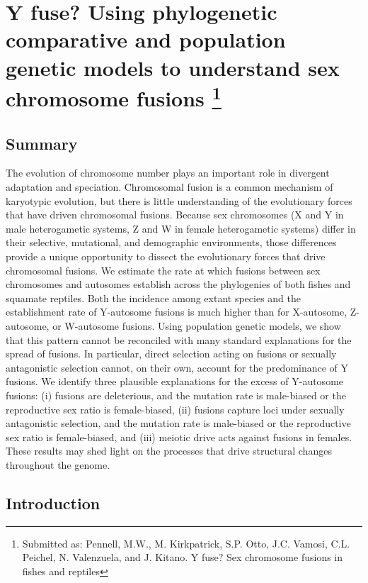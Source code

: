 \chapter[Y fuse? Using phylogenetic comparative and population genetic models to understand sex chromosome fusions]{Y fuse? Using phylogenetic comparative and population genetic models to understand sex chromosome fusions \footnote{Submitted as: Pennell, M.W., M. Kirkpatrick, S.P. Otto, J.C. Vamosi, C.L. Peichel, N. Valenzuela, and J. Kitano. Y fuse? Sex chromosome fusions in fishes and reptiles}}
\label{chap:sexchrom}

\section{Summary}

The evolution of chromosome number plays an important role in divergent adaptation and speciation. Chromosomal fusion is a common mechanism of karyotypic evolution, but there is little understanding of the evolutionary forces that have driven chromosomal fusions. Because sex chromosomes (X and Y in male heterogametic systems, Z and W in female heterogametic systems) differ in their selective, mutational, and demographic environments, those differences provide a unique opportunity to dissect the evolutionary forces that drive chromosomal fusions. We estimate the rate at which fusions between sex chromosomes and autosomes establish across the phylogenies of both fishes and squamate reptiles. Both the incidence among extant species and the establishment rate of Y-autosome fusions is much higher than for X-autosome, Z-autosome, or W-autosome fusions. Using population genetic models, we show that this pattern cannot be reconciled with many standard explanations for the spread of fusions. In particular, direct selection acting on fusions or sexually antagonistic selection cannot, on their own, account for the predominance of Y fusions. We identify three plausible explanations for the excess of Y-autosome fusions: (i) fusions are deleterious, and the mutation rate is male-biased or the reproductive sex ratio is female-biased, (ii) fusions capture loci under sexually antagonistic selection, and the mutation rate is male-biased or the reproductive sex ratio is female-biased, and (iii) meiotic drive acts against fusions in females. These results may shed light on the processes that drive structural changes throughout the genome.

\section{Introduction}


